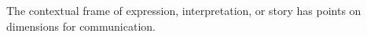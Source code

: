 

The contextual frame of expression, interpretation, or story has
points on dimensions for communication.

\bye
